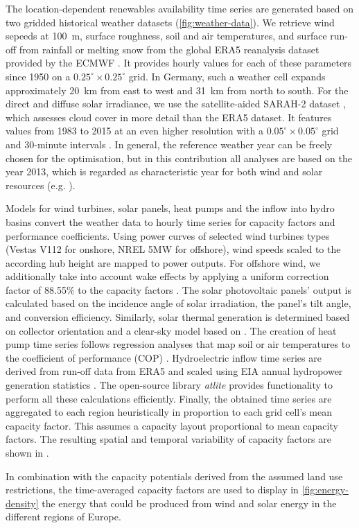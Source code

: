 The location-dependent renewables availability time series are generated based
on two gridded historical weather datasets (\cref{fig:weather-data}). We
retrieve wind sepeeds at \SI{100}{\metre}, surface roughness, soil and air
temperatures, and surface run-off from rainfall or melting snow from the global
ERA5 reanalysis dataset provided by the ECMWF . It provides hourly
values for each of these parameters since 1950 on a $0.25^{\circ} \times
0.25^{\circ}$ grid. In Germany, such a weather cell expands approximately
\SI{20}{\kilo\metre} from east to west and \SI{31}{km} from north to south. For
the direct and diffuse solar irradiance, we use the satellite-aided SARAH-2
dataset , which assesses cloud cover in more detail than the ERA5 dataset. It
features values from 1983 to 2015 at an even higher resolution with a
$0.05^{\circ} \times 0.05^{\circ}$ grid and 30-minute intervals . In
general, the reference weather year can be freely chosen for the optimisation,
but in this contribution all analyses are based on the year 2013, which is
regarded as characteristic year for both wind and solar resources (e.g.
).

Models for wind turbines, solar panels, heat pumps and the inflow into hydro
basins convert the weather data to hourly time series for capacity factors and
performance coefficients. Using power curves of selected wind turbines types
(Vestas V112 for onshore, NREL 5MW for offshore), wind speeds scaled to the
according hub height are mapped to power outputs. For offshore wind, we
additionally take into account wake effects by applying a uniform correction
factor of 88.55\% to the capacity factors .
The solar photovoltaic panels' output is calculated based on the incidence angle
of solar irradiation, the panel's tilt angle, and conversion efficiency.
Similarly, solar thermal generation is determined based on collector orientation
and a clear-sky model based on . The
creation of heat pump time series follows regression analyses that map soil or
air temperatures to the coefficient of performance (COP)
. Hydroelectric
inflow time series are derived from run-off data from ERA5 and scaled using EIA
annual hydropower generation statistics
. The
open-source library \textit{atlite} 
provides functionality to perform all these calculations efficiently. Finally,
the obtained time series are aggregated to each region heuristically in
proportion to each grid cell's mean capacity factor. This assumes a capacity
layout proportional to mean capacity factors. The resulting spatial and temporal
variability of capacity factors are shown in
.

In combination with the capacity potentials derived from the assumed land use
restrictions, the time-averaged capacity factors are used to display in
\cref{fig:energy-density} the energy that could be produced from wind and solar
energy in the different regions of Europe.
